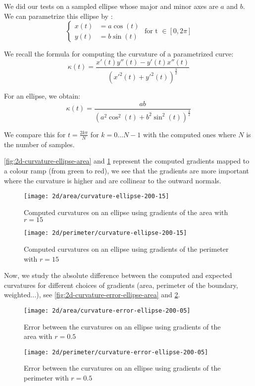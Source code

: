 We did our tests on a sampled ellipse whose major and minor axes are $ a $ and $ b $. We
can parametrize this ellipse by :
$$
\begin{cases}
    x(t) &= a \cos (t) \\
    y(t) &= b \sin (t)
\end{cases}
\text{ for t } \in [ 0, 2\pi ]
$$

We recall the formula for computing the curvature of a parametrized curve:
$$ \kappa(t) = \frac{x'(t) y''(t) - y'(t) x''(t)}{(x'^2(t) +
    y'^2(t))^{\frac{3}{2}} } $$

For an ellipse, we obtain:
$$ \kappa(t) = \frac{ab}{(a^2 \cos^2(t) + b^2 \sin^2(t))^{\frac{3}{2}} } $$

We compare this for $ t = \frac{2 k \pi}{N} $ for $ k = 0 \ldots N - 1 $ with
the computed ones where $ N $ is the number of samples.

\ref{fig:2d-curvature-ellipse-area} and \ref{fig:2d-curvature-ellipse-perimeter}
represent the computed gradients mapped to a colour ramp (from green to red), we
see that the gradients are more important where the curvature is higher and are
collinear to the outward normals.

\begin{figure}[h]
    \centering

    \texttt{[image: 2d/area/curvature-ellipse-200-15]}
    \caption{Computed curvatures on an ellipse using gradients of the area with $ r = 15 $}
    \label{fig:2d-curvature-ellipse-area}

    \texttt{[image: 2d/perimeter/curvature-ellipse-200-15]}
    \caption{Computed curvatures on an ellipse using gradients of the perimeter with $ r = 15 $}
    \label{fig:2d-curvature-ellipse-perimeter}
\end{figure}


Now, we study the absolute difference between the computed and expected
curvatures for different choices of gradients (area, perimeter of the boundary,
weighted...), see \ref{fig:2d-curvature-error-ellipse-area} and
\ref{fig:2d-curvature-error-ellipse-perimeter}.

\begin{figure}[h]
    \centering

    \texttt{[image: 2d/area/curvature-error-ellipse-200-05]}
    \caption{Error between the curvatures on an ellipse using gradients of the area with $ r = 0.5 $}
    \label{fig:2d-curvature-error-ellipse-area}

    \texttt{[image: 2d/perimeter/curvature-error-ellipse-200-05]}
    \caption{Error between the curvatures on an ellipse using gradients of the perimeter with $ r = 0.5 $}
    \label{fig:2d-curvature-error-ellipse-perimeter}
\end{figure}

